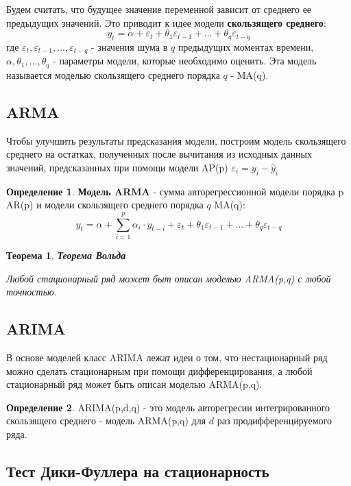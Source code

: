 \documentclass[aps,%
12pt,%
final,%
oneside,
onecolumn,%
musixtex, %
superscriptaddress,%
centertags]{article} %
\theoremstyle{plain}
\newtheorem{theorem}{Теорема}[section] %
\theoremstyle{definition}
\newtheorem{definition}{Определение}[subsection]
\theoremstyle{remark}
\begin{document}
Будем считать, что будущее значение переменной зависит от среднего ее предыдущих значений. Это приводит к идее модели \textbf{скользящего среднего}:
$$y_t = \alpha + \varepsilon_t + \theta_1\varepsilon_{t-1} + \ldots + \theta_q\varepsilon_{t-q}$$
где $\varepsilon_t, \varepsilon_{t-1},\ldots,\varepsilon_{t-q}$ - значения шума в $q$ предыдущих моментах времени, $\alpha,\theta_1,\ldots,\theta_q$ - параметры модели, которые необходимо оценить. Эта модель называется моделью скользящего среднего порядка $q$ - MA(q).

\newpage
\subsection{ARMA}

Чтобы улучшить результаты предсказания модели, построим модель скользящего среднего на остатках, полученных после вычитания из исходных данных значений, предсказанных при помощи модели AP(p) $\varepsilon_i = y_i - \hat{y}_i$

\begin{definition}
	\textbf{Модель ARMA} - сумма авторегрессионной модели порядка p AR(p) и модели скользящего среднего порядка $q$ MA(q):
	$$y_t = \alpha + \sum\limits_{i=1}^p \alpha_i\cdot y_{t-i} + \varepsilon_t +  \theta_1\varepsilon_{t-1} + \ldots + \theta_q\varepsilon_{t-q}$$
\end{definition}

\begin{theorem}
	\textbf{Теорема Вольда} 

	Любой стационарный ряд может быт описан моделью ARMA(p,q) с любой точностью.
\end{theorem}

\newpage
\subsection{ARIMA}

В основе моделей класс ARIMA лежат идеи о том, что нестационарный ряд можно сделать стационарным при помощи дифференцирования, а любой стационарный ряд может быть описан моделью ARMA(p,q).

\begin{definition}
	ARIMA(p,d,q) - это модель авторегресии интегрированного скользящего среднего - модель ARMA(p,q) для $d$ раз продифференцируемого ряда.
\end{definition}

\newpage
\subsection{Тест Дики-Фуллера на стационарность}
\end{document}
